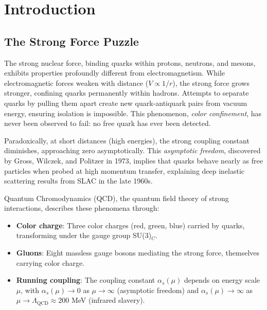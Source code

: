 \documentclass[11pt,a4paper]{article}
\theoremstyle{definition}
\theoremstyle{plain}
\theoremstyle{remark}
\begin{document}
\section{Introduction}
\label{sec:introduction}

\subsection{The Strong Force Puzzle}

The strong nuclear force, binding quarks within protons, neutrons, and mesons, exhibits properties profoundly different from electromagnetism. While electromagnetic forces weaken with distance ($V \propto 1/r$), the strong force grows stronger, confining quarks permanently within hadrons. Attempts to separate quarks by pulling them apart create new quark-antiquark pairs from vacuum energy, ensuring isolation is impossible. This phenomenon, \emph{color confinement}, has never been observed to fail: no free quark has ever been detected.

Paradoxically, at short distances (high energies), the strong coupling constant diminishes, approaching zero asymptotically. This \emph{asymptotic freedom}, discovered by Gross, Wilczek, and Politzer in 1973, implies that quarks behave nearly as free particles when probed at high momentum transfer, explaining deep inelastic scattering results from SLAC in the late 1960s.

Quantum Chromodynamics (QCD), the quantum field theory of strong interactions, describes these phenomena through:
\begin{itemize}[leftmargin=*,itemsep=3pt]
  \item \textbf{Color charge}: Three color charges (red, green, blue) carried by quarks, transforming under the gauge group SU(3)$_C$.
  \item \textbf{Gluons}: Eight massless gauge bosons mediating the strong force, themselves carrying color charge.
  \item \textbf{Running coupling}: The coupling constant $\alpha_s(\mu)$ depends on energy scale $\mu$, with $\alpha_s(\mu) \to 0$ as $\mu \to \infty$ (asymptotic freedom) and $\alpha_s(\mu) \to \infty$ as $\mu \to \Lambda_{\mathrm{QCD}} \approx 200$ MeV (infrared slavery).
\end{itemize}
\end{document}
